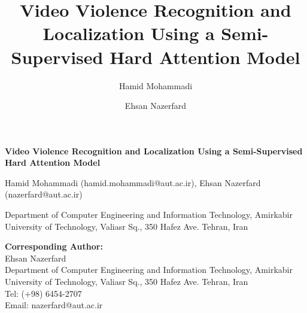 \documentclass[review]{elsarticle}
\begin{document}
\begin{frontmatter}


\begin{titlepage}
\begin{center}
\vspace*{1cm}

\textbf{ \large Video Violence Recognition and Localization Using a Semi-Supervised Hard Attention Model}

\vspace{1.5cm}

Hamid Mohammadi (hamid.mohammadi@aut.ac.ir), Ehsan Nazerfard (nazerfard@aut.ac.ir) \\

\hspace{10pt}

\begin{flushleft}
\small  
 Department of Computer Engineering and Information Technology, Amirkabir University of Technology, Valiasr Sq., 350 Hafez Ave. Tehran, Iran

\vspace{1cm}
\textbf{Corresponding Author:} \\
Ehsan Nazerfard \\
Department of Computer Engineering and Information Technology, Amirkabir University of Technology, Valiasr Sq., 350 Hafez Ave. Tehran, Iran \\
Tel: (+98) 6454-2707 \\
Email: nazerfard@aut.ac.ir

\end{flushleft}        
\end{center}
\end{titlepage}

\title{Video Violence Recognition and Localization Using a Semi-Supervised Hard Attention Model}

\author[label1]{Hamid Mohammadi}

\author[label1]{Ehsan Nazerfard }

\address[label1]{Department of Computer Engineering and Information Technology, Amirkabir University of Technology, Valiasr Sq., 350 Hafez Ave. Tehran, Iran}


\end{frontmatter}
\end{document}
